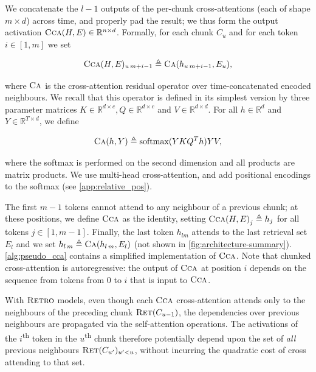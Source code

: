 We concatenate the $l{-}1$ outputs of the per-chunk cross-attentions (each of shape $m \times d$) across time, and properly pad the result; we thus form the output activation $\textsc{Cca}(H, E) \in \mathbb{R}^{n \times d}$. Formally, for each chunk $C_u$ and for each token $i \in [1, m]$ we set

\begin{equation}
    \textsc{Cca}(H, E)_{u\, m + i - 1} \triangleq \textsc{Ca}(h_{u \,m + i - 1}, E_{u}),
\end{equation}

where $\textsc{Ca}$ is the cross-attention residual operator over time-concatenated encoded neighbours. We recall that this operator is defined in its simplest version by three parameter matrices $K \in \mathbb{R}^{d \times c}, Q \in \mathbb{R}^{d \times c}$ and $V \in \mathbb{R}^{d \times d}$. For all $h \in \mathbb{R}^d$ and $Y \in \mathbb{R}^{T \times d}$, we define

\begin{equation}
    \textsc{Ca}(h, Y) \triangleq \textrm{softmax}(Y K Q^T h) Y V,
\end{equation}

where the softmax is performed on the second dimension and all products are matrix products. We use multi-head cross-attention, and add positional encodings to the \textrm{softmax} (see \autoref{app:relative_pos}).

The first $m-1$ tokens cannot attend to any neighbour of a previous chunk; at these positions, we define $\textsc{Cca}$ as the identity, setting ${\textsc{Cca}(H, E)}_j \triangleq h_j$ for all tokens $j \in [1, m-1]$. Finally, the last token $h_{l m}$ attends to the last retrieval set $E_l$ and we set $h_{l\,m} \triangleq \textsc{Ca}(h_{l\,m}, E_l)$ (not shown in \autoref{fig:architecture-summary}). 
\autoref{alg:pseudo_cca} contains a simplified implementation of $\textsc{Cca}$.
Note that chunked cross-attention is autoregressive: the output of $\textsc{Cca}$ at position $i$ depends on the sequence from tokens from $0$ to $i$ that is input to $\textsc{Cca}$.

With $\textsc{Retro}$ models, even though each $\textsc{Cca}$ cross-attention attends only to the neighbours of the preceding chunk $\textsc{Ret}(C_{u-1})$, the dependencies over previous neighbours are propagated via the self-attention operations. The activations of the $i$\textsuperscript{th} token in the $u$\textsuperscript{th} chunk therefore potentially depend upon the set of \emph{all} previous neighbours $\textsc{Ret}(C_{u'})_{u'<u}$, without incurring the quadratic cost of cross attending to that set.   

